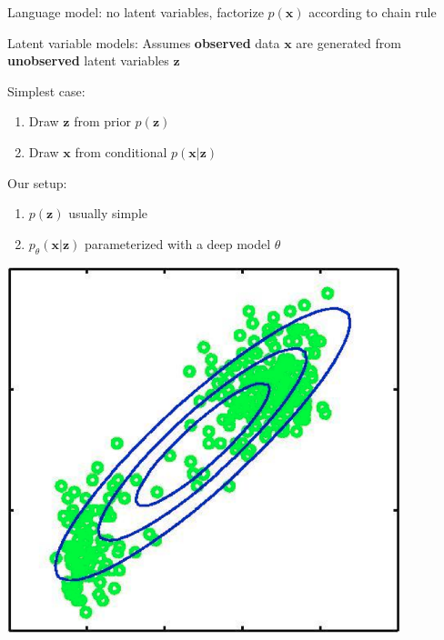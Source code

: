 \documentclass{beamer}
\let\tempone\itemize
\let\temptwo\enditemize
\renewenvironment{itemize}{\tempone\addtolength{\itemsep}{0.5\baselineskip}}{\temptwo}
\newcommand{\zvec}{\mathbf{z}}
\newcommand{\xvec}{\mathbf{x}}
\begin{document}
\begin{frame}
  \begin{center}
   \end{center}
\begin{itemize}
\item Language model: no latent variables, factorize $p(\xvec)$ according to chain rule
\item Latent variable models: Assumes \textbf{observed} data $\xvec$ are generated from \textbf{unobserved} latent variables $\zvec$
\item Simplest case:
\begin{enumerate}
\item Draw $\zvec$ from prior $p(\zvec)$ 
\item Draw $\xvec$ from conditional $p(\xvec | \zvec)$ 
\end{enumerate}
\item Our setup:
\begin{enumerate}
\item $p(\zvec)$ usually simple
\item $p_\theta(\xvec | \zvec)$  parameterized with a deep model $\theta$
 \end{enumerate}
\end{itemize}
\end{frame}

\begin{frame}
  \begin{center}
   \end{center}
   \center
\includegraphics[scale=0.5]{img/gmm1}
\end{frame}
\end{document}
